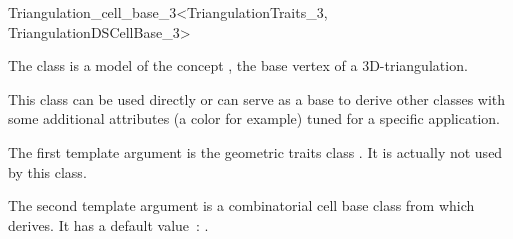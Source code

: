 

\begin{ccRefClass}{Triangulation_cell_base_3<TriangulationTraits_3, TriangulationDSCellBase_3>}

\ccDefinition

The class  is a model of the concept
, the base vertex of a 3D-triangulation.

This class can be used directly or can serve as a base to derive other classes
with some additional attributes (a color for example) tuned for a specific
application.


\ccParameters

The first template argument is the geometric traits class
.  It is actually not used by this class.

The second template argument is a combinatorial cell base class from which
 derives.
It has a default value~: .

\ccIsModel {}

\ccInheritsFrom {}

\ccSeeAlso

\\



\end{ccRefClass}
